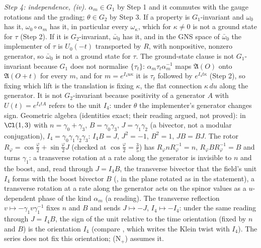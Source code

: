 \emph{Step 4: independence, (iv).} $\alpha_{m} \in G_{1}$ by Step 1 and it commutes with the gauge rotations and the grading; $\theta \in G_{2}$ by Step 3. If a property is $G_{1}$-invariant and $\omega_{0}$ has it, $\omega_{0}\circ\alpha_{m}$ has it, in particular every $\omega_{\kappa}$, which for $\kappa \neq 0$ is not a ground state for $\tau$ (Step 2). If it is $G_{2}$-invariant, $\bar\omega_{0}$ has it, and in the GNS space of $\bar\omega_{0}$ the implementer of $\tau$ is $U_{0}(-t)$ transported by $R$, with nonpositive, nonzero generator, so $\bar\omega_{0}$ is not a ground state for $\tau$. The ground-state clause is not $G_{1}$-invariant because $G_{1}$ does not normalise $\{\tau_{t}\}$: $\alpha_{m}\tau_{t}\alpha_{m}^{-1}$ maps $\mathfrak{A}(O)$ onto $\mathfrak{A}(O + t)$ for every $m$, and for $m = e^{I_{4}u\kappa}$ it is $\tau_{t}$ followed by $e^{I_{4}t\kappa}$ (Step 2), so fixing which lift is the translation is fixing $\kappa$, the flat connection $\kappa\,du$ along the generator. It is not $G_{2}$-invariant because positivity of a generator $A$ with $U(t) = e^{I_{4}tA}$ refers to the unit $I_{4}$: under $\theta$ the implementer's generator changes sign. Geometric algebra (identities exact; their reading argued, not proved): in $\Cl(1,3)$ with $n = \gamma_{0} + \gamma_{3}$, $B = \gamma_{0}\gamma_{3}$, $J = \gamma_{1}\gamma_{2}$ (a bivector, not a modular conjugation), $I_{4} = \gamma_{0}\gamma_{1}\gamma_{2}\gamma_{3}$: $I_{4}B = J$, $J^{2} = -1$, $B^{2} = 1$, $JB = BJ$. The rotor $R_{\varphi} = \cos\tfrac{\varphi}{2} + \sin\tfrac{\varphi}{2}J$ (checked at $\cos\tfrac{\varphi}{2} = \tfrac35$) has $R_{\varphi}nR_{\varphi}^{-1} = n$, $R_{\varphi}BR_{\varphi}^{-1} = B$ and turns $\gamma_{1}$: a transverse rotation at a rate along the generator is invisible to $n$ and the boost, and, read through $J = I_{4}B$, the transverse bivector that the field's unit $I_{4}$ forms with the boost bivector $B$ (, in the plane rotated as in the statement), a transverse rotation at a rate along the generator acts on the spinor values as a $u$-dependent phase of the kind $\alpha_{m}$ (a reading). The transverse reflection $v \mapsto -\gamma_{1}v\gamma_{1}^{-1}$ fixes $n$ and $B$ and sends $J \mapsto -J$, $I_{4} \mapsto -I_{4}$: under the same reading through $J = I_{4}B$, the sign of the unit relative to the time orientation (fixed by $n$ and $B$) is the orientation $I_{4}$ (compare , which writes the Klein twist with $I_{4}$). The series does not fix this orientation; (N$_{+}$) assumes it.

